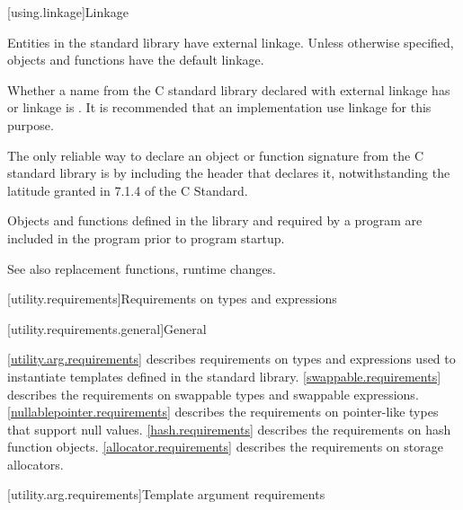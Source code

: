 [using.linkage]{Linkage}

\pnum
Entities in the \Cpp{} standard library have external linkage.
Unless otherwise specified, objects and functions have the default
linkage.

\pnum
{}%
Whether a name from the C standard library declared with
external linkage has
%
%
%
or
%
linkage is . It is recommended that an
implementation use
linkage for this purpose.
\begin{footnote}
The only reliable way to declare an object or
function signature from the C standard library is by including the header that
declares it, notwithstanding the latitude granted in 7.1.4 of the C
Standard.
\end{footnote}

\pnum
Objects and functions
defined in the library and required by a \Cpp{} program are included in
the program prior to program startup.

%
\pnum
See also
replacement functions,
runtime changes.

[utility.requirements]{Requirements on types and expressions}

[utility.requirements.general]{General}

\pnum
\ref{utility.arg.requirements}
describes requirements on types and expressions used to instantiate templates
defined in the \Cpp{} standard library.
\ref{swappable.requirements} describes the requirements on swappable types and
swappable expressions.
\ref{nullablepointer.requirements} describes the requirements on pointer-like
types that support null values.
\ref{hash.requirements} describes the requirements on hash function objects.
\ref{allocator.requirements} describes the requirements on storage
allocators.

[utility.arg.requirements]{Template argument requirements}

